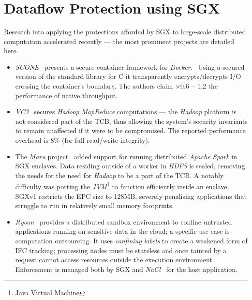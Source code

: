 \section{Dataflow Protection using SGX}
\paragraph{} Research into applying the protections afforded by SGX to large-scale distributed computation accelerated recently --- the most prominent projects are detailed here. 

\begin{itemize}
    \item \textit{SCONE}~\cite{10.5555/3026877.3026930} presents a secure container framework for \textit{Docker}.~\cite{docker-security} Using a secured version of the standard library for C it transparently encrypts/decrypts I/O crossing the container's boundary. The authors claim $\times 0.6-1.2$ the performance of native throughput.
    \item \textit{VC3}~\cite{vc37163017} secures \textit{Hadoop} \textit{MapReduce} computations --- the \textit{Hadoop} platform is not considered part of the TCB, thus allowing the system's security invariants to remain unaffected if it were to be compromised. The reported performance overhead is 8\% (for full read/write integrity).
    \item The \textit{Maru} project~\cite{maru} added support for running distributed \textit{Apache Spark} in SGX enclaves. Data residing outside of a worker in \textit{HDFS} is sealed, removing the needs for the need for \textit{Hadoop} to be a part of the TCB. A notably difficulty was porting the \textit{JVM}\footnote{Java Virtual Machine} to function efficiently inside an enclave; SGXv1 restricts the EPC size to 128MB, severely penalising applications that struggle to run in relatively small memory footprints.
    \item \textit{Ryoan}~\cite{ryoan199358} provides a distributed sandbox environment to confine untrusted applications running on sensitive data in the cloud; a specific use case is computation outsourcing. It uses \textit{confining labels} to create a weakened form of IFC tracking; processing nodes must be stateless and once tainted by a request cannot access resources outside the execution environment. Enforcement is managed both by SGX and \textit{NaCl}~\cite{nacl} for the host application. 
\end{itemize}

